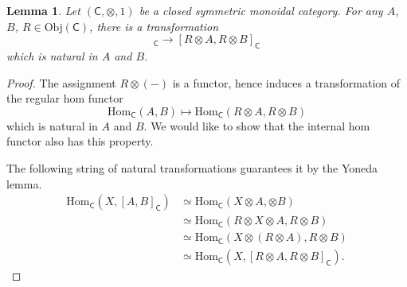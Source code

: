 \documentclass[a4paper]{report}
\newcommand{\Obj}{\mathrm{Obj}}
\newcommand{\Hom}{\mathrm{Hom}}
\theoremstyle{definition}
\theoremstyle{plain}
\newtheorem{lemma}{Lemma}[section]
\theoremstyle{remark}
\begin{document}
\begin{lemma}
  \label{lemma:cantensorbothsidesofinternalhom}
  Let $(\mathsf{C}, \otimes, 1)$ be a closed symmetric monoidal category. For any $A$, $B$, $R \in \Obj(\mathsf{C})$, there is a transformation
  \begin{equation*}
    [A, B]_{\mathsf{C}} \to [R \otimes A, R \otimes B]_{\mathsf{C}}
  \end{equation*}
  which is natural in $A$ and $B$.
\end{lemma}
\begin{proof}
  The assignment $R \otimes (-)$ is a functor, hence induces a transformation of the regular hom functor
  \begin{equation*}
    \Hom_{\mathsf{C}}(A, B) \mapsto \Hom_{\mathsf{C}}(R \otimes A, R \otimes B)
  \end{equation*}
  which is natural in $A$ and $B$. We would like to show that the internal hom functor also has this property.

  The following string of natural transformations guarantees it by the Yoneda lemma.
  \begin{align*}
    \Hom_{\mathsf{C}}(X, [A, B]_{\mathsf{C}}) &\simeq \Hom_{\mathsf{C}}(X \otimes A, \otimes B) \\
    &\simeq \Hom_{\mathsf{C}}(R \otimes X \otimes A, R \otimes B) \\
    &\simeq \Hom_{\mathsf{C}}(X \otimes (R \otimes A), R \otimes B) \\
    & \simeq \Hom_{\mathsf{C}}(X, [R \otimes A, R \otimes B]_{\mathsf{C}}).
  \end{align*}
\end{proof}
\end{document}
